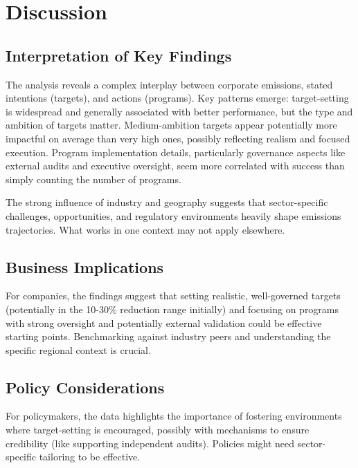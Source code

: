 \documentclass[11pt,a4paper]{article}
\begin{document}
\section{Discussion}

\subsection{Interpretation of Key Findings}
The analysis reveals a complex interplay between corporate emissions, stated intentions (targets), and actions (programs). Key patterns emerge: target-setting is widespread and generally associated with better performance, but the type and ambition of targets matter. Medium-ambition targets appear potentially more impactful on average than very high ones, possibly reflecting realism and focused execution. Program implementation details, particularly governance aspects like external audits and executive oversight, seem more correlated with success than simply counting the number of programs.

The strong influence of industry and geography suggests that sector-specific challenges, opportunities, and regulatory environments heavily shape emissions trajectories. What works in one context may not apply elsewhere.

\subsection{Business Implications}
For companies, the findings suggest that setting realistic, well-governed targets (potentially in the 10-30\% reduction range initially) and focusing on programs with strong oversight and potentially external validation could be effective starting points. Benchmarking against industry peers and understanding the specific regional context is crucial.

\subsection{Policy Considerations}
For policymakers, the data highlights the importance of fostering environments where target-setting is encouraged, possibly with mechanisms to ensure credibility (like supporting independent audits). Policies might need sector-specific tailoring to be effective.
\end{document}
